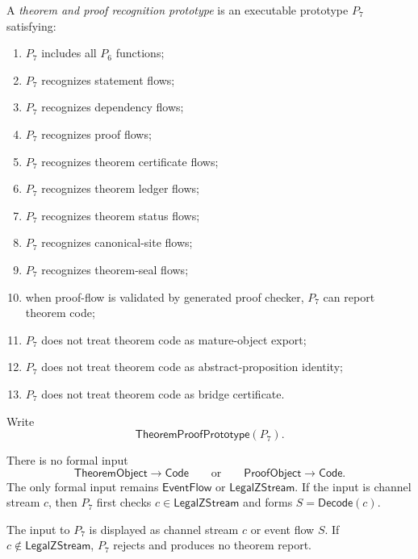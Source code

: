 \begin{definition}
\label{def:theorem-proof-p7-prototype}
A \emph{theorem and proof recognition prototype} is an executable prototype $P_7$ satisfying:
\begin{enumerate}
\item $P_7$ includes all $P_6$ functions;
\item $P_7$ recognizes statement flows;
\item $P_7$ recognizes dependency flows;
\item $P_7$ recognizes proof flows;
\item $P_7$ recognizes theorem certificate flows;
\item $P_7$ recognizes theorem ledger flows;
\item $P_7$ recognizes theorem status flows;
\item $P_7$ recognizes canonical-site flows;
\item $P_7$ recognizes theorem-seal flows;
\item when proof-flow is validated by generated proof checker, $P_7$ can report theorem code;
\item $P_7$ does not treat theorem code as mature-object export;
\item $P_7$ does not treat theorem code as abstract-proposition identity;
\item $P_7$ does not treat theorem code as bridge certificate.
\end{enumerate}
Write
$$
  \mathsf{TheoremProofPrototype}(P_7).
$$
\end{definition}

\begin{principle}
\label{prin:theorem-proof-theorem-not-input}
There is no formal input
$$
  \mathsf{TheoremObject}\to\mathsf{Code}
  \qquad\text{or}\qquad
  \mathsf{ProofObject}\to\mathsf{Code}.
$$
The only formal input remains $\mathsf{EventFlow}$ or $\mathsf{LegalZStream}$. If the input is channel stream $c$, then $P_7$ first checks $c\in\mathsf{LegalZStream}$ and forms $S=\mathsf{Decode}(c)$.
\end{principle}

\begin{definition}[$P_7$ input]
\label{def:theorem-proof-p7-input}
The input to $P_7$ is displayed as channel stream $c$ or event flow $S$. If $c\notin\mathsf{LegalZStream}$, $P_7$ rejects and produces no theorem report.
\end{definition}

